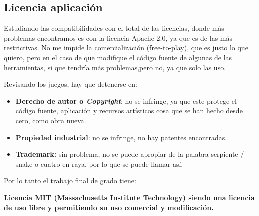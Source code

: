\subsection{Licencia aplicación}
Estudiando las compatibilidades con el total de las licencias, donde más problemas encontramos es con la licencia Apache 2.0, ya que es de las más restrictivas. No me impide la comercialización (free-to-play), que es justo lo que quiero, pero en el caso de que modifique el código fuente de algunas de las herramientas, si que tendría más problemas,pero no, ya que solo las uso.

Revisando los juegos, hay que detenerse en:

\begin{itemize}
	\item \textbf{Derecho de autor o \emph{Copyright}}: no se infringe, ya que este protege el código fuente, aplicación y recursos artísticos cosa que se han hecho desde cero, como obra nueva.
	\item \textbf{Propiedad industrial}: no se infringe, no hay patentes encontradas. 
	\item \textbf{Trademark:} sin problema, no se puede apropiar de la palabra serpiente / snake o cuatro en raya, por lo que se puede llamar así.
\end{itemize}

Por lo tanto el trabajo final de grado tiene:
 						
\textbf{Licencia MIT (Massachusetts Institute Technology) siendo una licencia de uso libre y permitiendo su uso comercial y modificación.}




